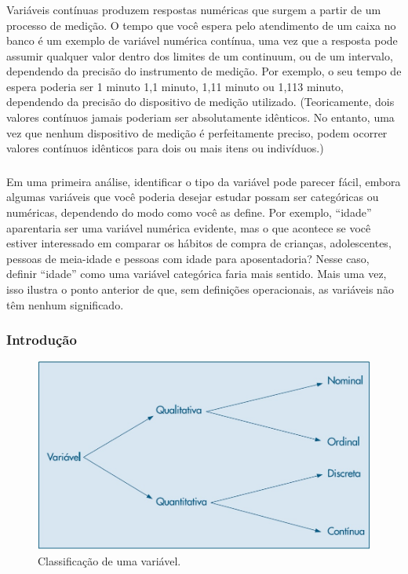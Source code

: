 \documentclass[14pt,aspectratio=1610]{beamer}
\begin{document}
\begin{frame}{}
\frametitle{}
\begin{block}{}
\justifying
Variáveis contínuas produzem respostas numéricas que surgem a partir de um processo de medição. O tempo que você espera pelo atendimento de um caixa no banco é um exemplo de variável numérica contínua, uma vez que a resposta pode assumir qualquer valor dentro dos limites de um continuum, ou de um intervalo, dependendo da precisão do instrumento de medição. Por exemplo, o seu tempo de espera poderia ser 1 minuto 1,1 minuto, 1,11 minuto ou 1,113 minuto, dependendo da precisão do dispositivo de medição utilizado. (Teoricamente, dois valores contínuos jamais poderiam ser absolutamente idênticos. No entanto, uma vez que nenhum dispositivo de medição é perfeitamente preciso, podem ocorrer valores contínuos idênticos para dois ou mais itens ou indivíduos.)
\end{block}
\end{frame}

\begin{frame}{}
\frametitle{}
\begin{block}{}
\justifying
Em uma primeira análise, identificar o tipo da variável pode parecer fácil, embora algumas variáveis que você poderia desejar estudar possam ser categóricas ou numéricas, dependendo do modo como você as define. Por exemplo, “idade” aparentaria ser uma variável numérica evidente, mas o que acontece se você estiver interessado em comparar os hábitos de compra de crianças, adolescentes, pessoas de meia-idade e pessoas com idade para aposentadoria? Nesse caso, definir “idade” como uma variável categórica faria mais sentido. Mais uma vez, isso ilustra o ponto anterior de que, sem definições operacionais, as variáveis não têm nenhum significado.
\end{block}
\end{frame}

\begin{frame}{}
\frametitle{Introdução}
\begin{block}{}
\justifying
\begin{figure}[H]
    \centering
    \includegraphics[scale=0.5]{Fig2}
    \caption{Classificação de uma variável.}
    \label{Fig2_ex}
  \end{figure}
\end{block}
\end{frame}
\end{document}
